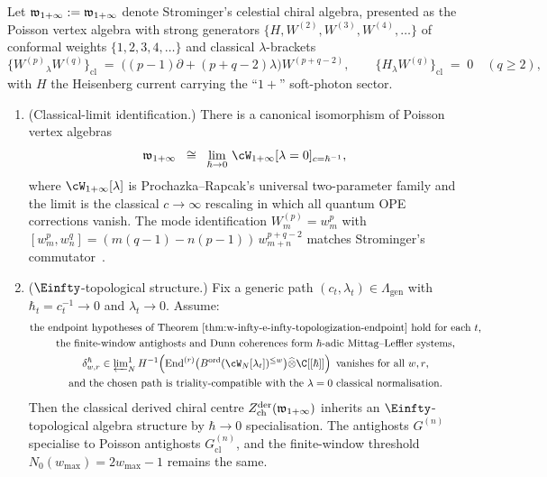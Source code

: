 \begin{theorem}
\label{thm:celestial-winfty-classical-endpoint}
Let $\mathfrak{w}_{1+\infty} := \mathfrak{w}_{1+\infty}$ denote Strominger's celestial
chiral algebra, presented as the Poisson vertex algebra with strong
generators $\{H, W^{(2)}, W^{(3)}, W^{(4)}, \dots\}$ of conformal weights
$\{1, 2, 3, 4, \dots\}$ and classical $\lambda$-brackets
\begin{equation}\label{eq:celestial-winfty-lambda-brackets}
\{W^{(p)}{}_\lambda W^{(q)}\}_{\mathrm{cl}}
\;=\;
\bigl((p-1)\partial + (p+q-2)\lambda\bigr) W^{(p+q-2)},
\qquad
\{H{}_\lambda W^{(q)}\}_{\mathrm{cl}} \;=\; 0
\quad (q \ge 2),
\end{equation}
with $H$ the Heisenberg current carrying the ``$1+$'' soft-photon
sector.
\begin{enumerate}[label=\textup{(\roman*)}]
\item \textup{(Classical-limit identification.)} There is a canonical
isomorphism of Poisson vertex algebras
\[
\wtc
\;\;\cong\;\;
\lim_{\hbar \to 0}\,\cW_{1+\infty}[\lambda=0]_{c = \hbar^{-1}},
\]
where $\cW_{1+\infty}[\lambda]$ is Prochazka--Rapcak's universal
two-parameter family \cite{ProchazkaRapcak18} and the limit is the
classical $c \to \infty$ rescaling in which all quantum OPE corrections
vanish. The mode identification $W^{(p)}_m = w^p_m$ with
$[w^p_m, w^q_n] = (m(q-1) - n(p-1))\, w^{p+q-2}_{m+n}$ matches
Strominger's commutator~\cite[eq.~(1)]{StromingerWInfinityCelestial}.

\item \textup{($\Einfty$-topological structure.)} Fix a generic path
\((c_t,\lambda_t)\in\Lambda_{\mathrm{gen}}\) with
\(\hbar_t=c_t^{-1}\to0\) and \(\lambda_t\to0\). Assume:
\[
\begin{gathered}
\text{the endpoint hypotheses of
Theorem~\ref{thm:w-infty-e-infty-topologization-endpoint} hold for
each \(t\),}\\
\text{the finite-window antighosts and Dunn coherences form
\(\hbar\)-adic Mittag--Leffler systems,}\\
\delta^{\hbar}_{w,r}\in
\varprojlim\nolimits_N^{1}
H^{-1}\!\left(\operatorname{End}^{(r)}
\bigl(B^{\mathrm{ord}}(\cW_N[\lambda_t])^{\le w}\bigr)
\widehat{\otimes}\C[[\hbar]]\right)
\text{ vanishes for all \(w,r\),}\\
\text{and the chosen path is triality-compatible with the
\(\lambda=0\) classical normalisation.}
\end{gathered}
\]
Then the classical derived chiral centre
\(Z^{\mathrm{der}}_{\mathrm{ch}}(\mathfrak{w}_{1+\infty})\) inherits an
\(\Einfty\)-topological algebra structure by \(\hbar\to0\)
specialisation. The antighosts \(G^{(n)}\) specialise to Poisson
antighosts \(G^{(n)}_{\mathrm{cl}}\), and the finite-window threshold
\(N_0(w_{\max})=2w_{\max}-1\) remains the same.


\end{enumerate}
\end{theorem}
